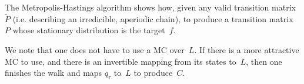 The Metropolis-Hastings algorithm shows how, given any valid transition matrix~$\tilde{P}$
(i.e. describing an irredicible, aperiodic chain), to produce a transition matrix~$P$
whose stationary distribution is the target~$f$. 

We note that one does not have to use a MC over~$L$.  If there is a
more attractive MC to use, and there is an invertible mapping from
its states to~$L$, then one finishes the walk and maps $q_\tau$ to~$L$
to produce~$C$.

\fi


